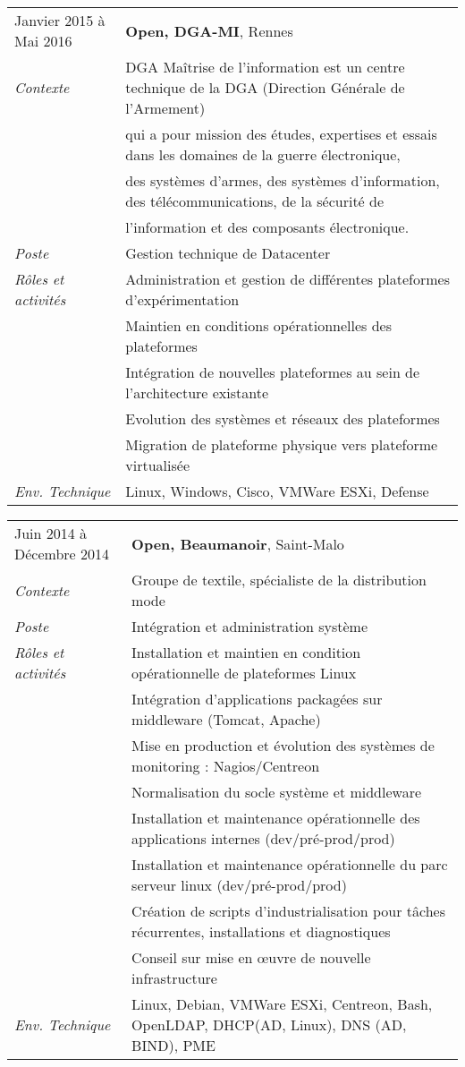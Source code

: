\documentclass[a4paper,8pt]{article}
\begin{document}
\begin{tabular}{P{3.5cm}|p{13cm}}
Janvier 2015 à Mai 2016		& \textbf{Open, DGA-MI}, Rennes\\
\textsl{Contexte}      		& DGA Maîtrise de l'information est un centre technique de la DGA (Direction Générale de l'Armement)\\
				& qui a pour mission des études, expertises et essais dans les domaines de la guerre électronique,\\
				& des systèmes d'armes, des systèmes d'information, des télécommunications, de la sécurité de \\
				& l'information et des composants électronique.\\
\textsl{Poste}			& Gestion technique de Datacenter\\
\textsl{Rôles et activités}	& Administration et gestion de différentes plateformes d'expérimentation\\
				& Maintien en conditions opérationnelles des plateformes\\
				& Intégration de nouvelles plateformes au sein de l'architecture existante\\
				& Evolution des systèmes et réseaux des plateformes\\
				& Migration de plateforme physique vers plateforme virtualisée\\
\textsl{Env. Technique}		& Linux, Windows, Cisco, VMWare ESXi, Defense\\
\end{tabular}

\begin{tabular}{P{3.5cm}|p{13cm}}
Juin 2014 à Décembre 2014	& \textbf{Open, Beaumanoir}, Saint-Malo\\
\textsl{Contexte}		& Groupe de textile, spécialiste de la distribution mode\\
\textsl{Poste}			& Intégration et administration système\\
\textsl{Rôles et activités}	& Installation et maintien en condition opérationnelle de plateformes Linux\\
				& Intégration d'applications packagées sur middleware (Tomcat, Apache)\\
				& Mise en production et évolution des systèmes de monitoring : Nagios/Centreon\\
				& Normalisation du socle système et middleware\\
				& Installation et maintenance opérationnelle des applications internes (dev/pré-prod/prod)\\
				& Installation et maintenance opérationnelle du parc serveur linux (dev/pré-prod/prod)\\
				& Création de scripts d'industrialisation pour tâches récurrentes, installations et diagnostiques\\
				& Conseil sur mise en œuvre de nouvelle infrastructure\\
\textsl{Env. Technique}		& Linux, Debian, VMWare ESXi, Centreon, Bash, OpenLDAP, DHCP(AD, Linux), DNS (AD, BIND), PME\\
\end{tabular}
\end{document}
